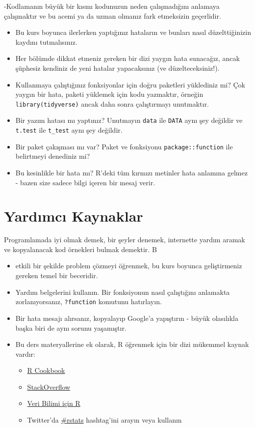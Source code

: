 \documentclass[
  oneside]{book}
\providecommand{\tightlist}{%
  \setlength{\itemsep}{0pt}\setlength{\parskip}{0pt}}
\begin{document}
-Kodlamanın büyük bir kısmı kodunuzun neden çalışmadığını anlamaya çalışmaktır ve bu acemi ya da uzman olmanız fark etmeksizin geçerlidir.

\begin{itemize}
\item
  Bu kurs boyunca ilerlerken yaptığınız hataların ve bunları nasıl düzelttiğinizin kaydını tutmalısınız.
\item
  Her bölümde dikkat etmeniz gereken bir dizi yaygın hata sunacağız, ancak şüphesiz kendiniz de yeni hatalar yapacaksınız (ve düzelteceksiniz!).
\item
  Kullanmaya çalıştığınız fonksiyonlar için doğru paketleri yüklediniz mi? Çok yaygın bir hata, paketi yüklemek için kodu yazmaktır, örneğin \texttt{library(tidyverse)} ancak daha sonra çalıştırmayı unutmaktır.
\item
  Bir yazım hatası mı yaptınız? Unutmayın \texttt{data} ile \texttt{DATA} aynı şey değildir ve \texttt{t.test} ile \texttt{t\_test} aynı şey değildir.
\item
  Bir paket çakışması mı var? Paket ve fonksiyonu \texttt{package::function} ile belirtmeyi denediniz mi?
\item
  Bu kesinlikle bir hata mı? R'deki tüm kırmızı metinler hata anlamına gelmez - bazen size sadece bilgi içeren bir mesaj verir.
\end{itemize}

\hypertarget{yardux131mcux131-kaynaklar}{%
\section{Yardımcı Kaynaklar}\label{yardux131mcux131-kaynaklar}}

Programlamada iyi olmak demek, bir şeyler denemek, internette yardım aramak ve kopyalanacak kod örnekleri bulmak demektir. B

\begin{itemize}
\item
  etkili bir şekilde problem çözmeyi öğrenmek, bu kurs boyunca geliştirmeniz gereken temel bir beceridir.
\item
  Yardım belgelerini kullanın. Bir fonksiyonun nasıl çalıştığını anlamakta zorlanıyorsanız, \texttt{?function} komutunu hatırlayın.
\item
  Bir hata mesajı alırsanız, kopyalayıp Google'a yapıştırın - büyük olasılıkla başka biri de aynı sorunu yaşamıştır.
\item
  Bu ders materyallerine ek olarak, R öğrenmek için bir dizi mükemmel kaynak vardır:

  \begin{itemize}
  \tightlist
  \item
    \href{http://www.cookbook-r.com/}{R Cookbook}
  \item
    \href{https://stackoverflow.com/}{StackOverflow}
  \item
    \href{https://r4ds.had.co.nz/}{Veri Bilimi için R}
  \item
    Twitter'da \href{https://twitter.com/search?f=tweets\&q=\%23rstats\&src=typd}{\#rstats} hashtag'ini arayın veya kullanın
  \end{itemize}
\end{itemize}
\end{document}
